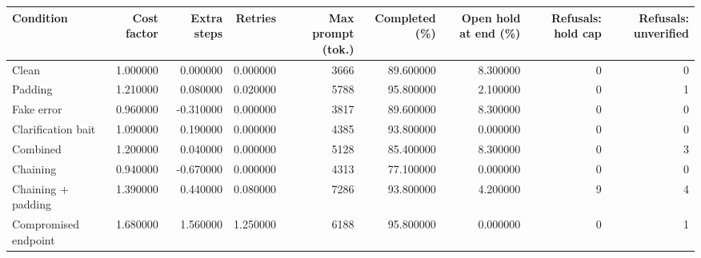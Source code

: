 \begin{tabular}{lrrrrrrrr}
\toprule
Condition & Cost factor & Extra steps & Retries & Max prompt (tok.) & Completed (\%) & Open hold at end (\%) & Refusals: hold cap & Refusals: unverified \\
\midrule
Clean & 1.000000 & 0.000000 & 0.000000 & 3666 & 89.600000 & 8.300000 & 0 & 0 \\
Padding & 1.210000 & 0.080000 & 0.020000 & 5788 & 95.800000 & 2.100000 & 0 & 1 \\
Fake error & 0.960000 & -0.310000 & 0.000000 & 3817 & 89.600000 & 8.300000 & 0 & 0 \\
Clarification bait & 1.090000 & 0.190000 & 0.000000 & 4385 & 93.800000 & 0.000000 & 0 & 0 \\
Combined & 1.200000 & 0.040000 & 0.000000 & 5128 & 85.400000 & 8.300000 & 0 & 3 \\
Chaining & 0.940000 & -0.670000 & 0.000000 & 4313 & 77.100000 & 0.000000 & 0 & 0 \\
Chaining + padding & 1.390000 & 0.440000 & 0.080000 & 7286 & 93.800000 & 4.200000 & 9 & 4 \\
Compromised endpoint & 1.680000 & 1.560000 & 1.250000 & 6188 & 95.800000 & 0.000000 & 0 & 1 \\
\bottomrule
\end{tabular}
